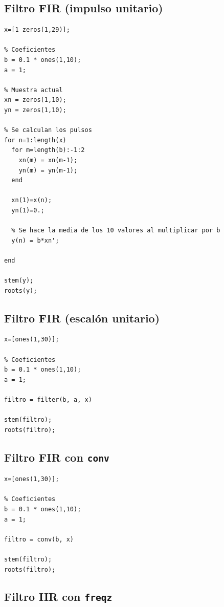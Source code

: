 \documentclass[11pt,a4paper]{article}
\begin{document}
\subsection{Filtro FIR (impulso unitario)}
\label{code5}

\begin{lstlisting}[frame=single]
% Se define el array con los pulsos
x=[1 zeros(1,29)];

% Coeficientes
b = 0.1 * ones(1,10);
a = 1;

% Muestra actual
xn = zeros(1,10);
yn = zeros(1,10);

% Se calculan los pulsos
for n=1:length(x)
  for m=length(b):-1:2
    xn(m) = xn(m-1);
    yn(m) = yn(m-1);
  end

  xn(1)=x(n);
  yn(1)=0.;

  % Se hace la media de los 10 valores al multiplicar por b
  y(n) = b*xn';

end

stem(y);
roots(y);
\end{lstlisting}

\subsection{Filtro FIR (escalón unitario)}
\label{code6}

\begin{lstlisting}[frame=single]
% Se define el array con los pulsos
x=[ones(1,30)];

% Coeficientes
b = 0.1 * ones(1,10);
a = 1;

filtro = filter(b, a, x)

stem(filtro);
roots(filtro);
\end{lstlisting}

\subsection{Filtro FIR con \texttt{conv}}
\label{code7}

\begin{lstlisting}[frame=single]
% Se define el array con los pulsos
x=[ones(1,30)];

% Coeficientes
b = 0.1 * ones(1,10);
a = 1;

filtro = conv(b, x)

stem(filtro);
roots(filtro);
\end{lstlisting}

\subsection{Filtro IIR con \texttt{freqz}}
\label{code8}
\end{document}

